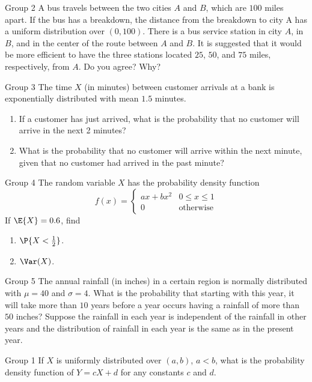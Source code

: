 \documentclass{article}
\theoremstyle{plain}
\theoremstyle{definition}
\theoremstyle{remark}
\begin{document}
\begin{problem}
    {Group 2}
    A bus travels between the two cities $A$ and $B$, which are $100$ miles apart. If the bus has a breakdown, the distance from the breakdown to city A has a uniform distribution over $(0, 100)$. There is a bus service station in city $A$, in $B$, and in the center of the route between $A$ and $B$. It is suggested that it would be more efficient to have the three stations located $25$, $50$, and $75$ miles, respectively, from $A$. Do you agree? Why?
\end{problem}

\begin{problem}
    {Group 3}
    The time $X$ (in minutes) between customer arrivals at a bank is exponentially distributed with mean $1.5$ minutes.
    \begin{enumerate}
        \item If a customer has just arrived, what is the probability         that no customer will arrive in the next 2 minutes?
        \item What is the probability that no customer will arrive within the next minute, given that no customer had arrived in the past minute?
    \end{enumerate}
\end{problem}

\begin{problem}
    {Group 4}
    The random variable $X$ has the probability density function
    \[f(x)={
        \begin{cases}
            ax+bx^2 & 0\leq x\leq 1\\
            0       & \text{otherwise}
        \end{cases}
    }\]
    If $\E{X}=0.6$, find
    \begin{enumerate}
        \item $\P{X<\frac{1}{2}}$.
        \item $\Var(X)$.
    \end{enumerate}
\end{problem}

\begin{problem}
    {Group 5}
    The annual rainfall (in inches) in a certain region is normally distributed with $\mu = 40$ and $\sigma = 4$. What is the probability that starting with this year, it will take more than $10$ years before a year occurs having a rainfall of more than $50$ inches? Suppose the rainfall in each year is independent of the rainfall in other years and the distribution of rainfall in each year is the same as in the present year.
\end{problem}
\begin{problem}
    {Group 1}
    If $X$ is uniformly distributed over $(a, b)$, $a < b$, what is the probability density function of $Y = cX + d$ for any constants $c$ and $d$.
\end{problem}
\end{document}
